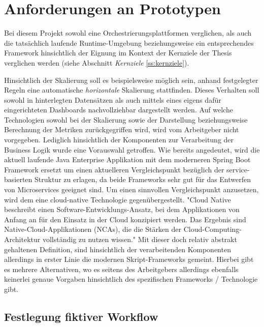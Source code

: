 \section{Anforderungen an Prototypen}

Bei diesem Projekt sowohl eine Orchestrierungsplattformen verglichen, als auch die tatsächlich laufende Runtime-Umgebung beziehungsweise ein entsprechendes Framework hinsichtlich der Eignung im Kontext der Kernziele der Thesis verglichen werden (siehe Abschnitt \emph{Kernziele} \ref{ss:kernziele}). 

Hinsichtlich der Skalierung soll es beispielsweise möglich sein, anhand festgelegter Regeln eine automatische \emph{horizontale} Skalierung stattfinden. Dieses Verhalten soll sowohl in hinterlegten Datensätzen als auch mittels eines eigens dafür eingerichteten Dashboards nachvollziehbar dargestellt werden. Auf welche Technologien sowohl bei der Skalierung sowie der Darstellung beziehungsweise Berechnung der Metriken zurückgegriffen wird, wird vom Arbeitgeber nicht vorgegeben. Lediglich hinsichtlich der Komponenten zur Verarbeitung der Business Logik wurde eine Vorauswahl getroffen. Wie bereits angedeutet, wird die aktuell laufende Java Enterprise Applikation mit dem moderneren Spring Boot Framework ersetzt um einen aktuelleren Vergleichspunkt bezüglich der service-basierten Struktur zu erlagen, da beide Frameworks sehr gut für das Entwerfen von Microservices geeignet sind. Um einen sinnvollen Vergleichspunkt anzusetzen, wird dem eine cloud-native Technologie gegenübergestellt. "Cloud Native beschreibt einen Software-Entwicklungs-Ansatz, bei dem Applikationen von Anfang an für den Einsatz in der Cloud konzipiert werden. Das Ergebnis sind Native-Cloud-Applikationen (NCAs), die die Stärken der Cloud-Computing-Architektur vollständig zu nutzen wissen." \cite{cn-def} Mit dieser doch relativ abstrakt gehaltenen Definition, sind hinsichtlich der verarbeitenden Komponenten allerdings in erster Linie die modernen Skript-Frameworks gemeint. Hierbei gibt es mehrere Alternativen, wo es seitens des Arbeitgebers allerdings ebenfalls keinerlei genaue Vorgaben hinsichtlich des spezifischen Frameworks / Technologie gibt.

\subsection{Festlegung fiktiver Workflow}
\label{ss:fiktiverWorkflow}

